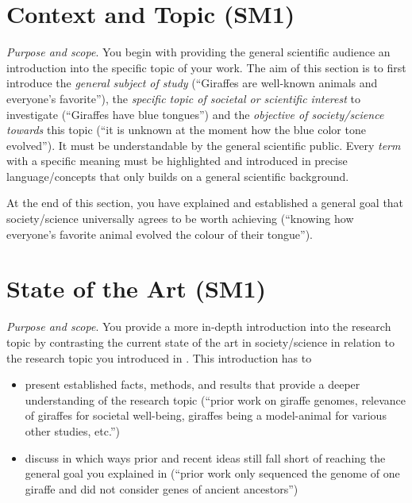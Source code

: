 \section{Context and Topic (SM1)}\label{sec:introduction:topic}

\emph{Purpose and scope}.
You begin with providing the general scientific audience an introduction into the specific topic of your work.
The aim of this section is to first introduce the \emph{general subject of study} (``Giraffes are well-known animals and everyone's favorite''), the \emph{specific topic of societal or scientific interest} to investigate (``Giraffes have blue tongues'') and the \emph{objective of society/science towards} this topic (``it is unknown at the moment how the blue color tone evolved'').
It must be understandable by the general scientific public.
Every \emph{term} with a specific meaning must be highlighted and introduced in precise language/concepts that only builds on a general scientific background.

At the end of this section, you have explained and established a general goal that society/science universally agrees to be worth achieving (``knowing how everyone's favorite animal evolved the colour of their tongue'').

\section{State of the Art (SM1)}\label{sec:introduction:state-of-art}

\emph{Purpose and scope}.
You provide a more in-depth introduction into the research topic by contrasting the current state of the art in society/science in relation to the research topic you introduced in .
This introduction has to

\begin{itemize}
  \item present established facts, methods, and results that provide a deeper understanding of the research topic (``prior work on giraffe genomes, relevance of giraffes for societal well-being, giraffes being a model-animal for various other studies, etc.'')
  \item discuss in which ways prior and recent ideas still fall short of reaching the general goal you explained in  (``prior work only sequenced the genome of one giraffe and did not consider genes of ancient ancestors'')
\end{itemize}

